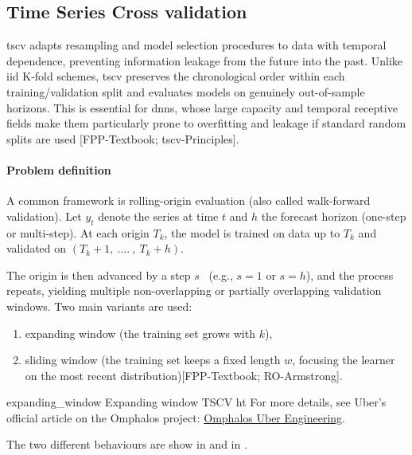 \subsection{Time Series Cross validation}

\acrfull{tscv} adapts resampling and model selection procedures to data with temporal dependence, preventing information leakage from the future into the past. Unlike \acrfull{iid} K-fold schemes, \acrshort{tscv} preserves the chronological order within each training/validation split and evaluates models on genuinely out-of-sample horizons. This is essential for  \acrshort{dnns}, whose large capacity and temporal receptive fields make them particularly prone to overfitting and leakage if standard random splits are used [FPP-Textbook; \acrshort{tscv}-Principles].

\paragraph{Problem definition}

A common framework is rolling-origin evaluation (also called walk-forward validation). Let $y_t$ denote the series at time $t$ and $h$ the forecast horizon (one-step or multi-step). At each origin 
$T_k$, the model is trained on data up to 
$T_k$ and validated on 
$(T_k+1,\ .... \ , \ T_k+ h)$.

The origin is then advanced by a step $s$ \ (e.g., $s=1$ or $s=h$), and the process repeats, yielding multiple non-overlapping or partially overlapping validation windows. Two main variants are used: 

\begin{enumerate}[label=\roman*.]
    \item expanding window (the training set grows with $k$),
    \item sliding window (the training set keeps a fixed length $w$, focusing the learner on the most recent distribution)[FPP-Textbook; RO-Armstrong].
\end{enumerate}


\myfigure
  {expanding_window}
  {Expanding window TSCV}
  {ht}
  {For more details, see Uber’s official article on the Omphalos project: \href{https://www.uber.com/en-IT/blog/omphalos/}{Omphalos Uber Engineering}.}




    
The two different behaviours are show in  and in . 


